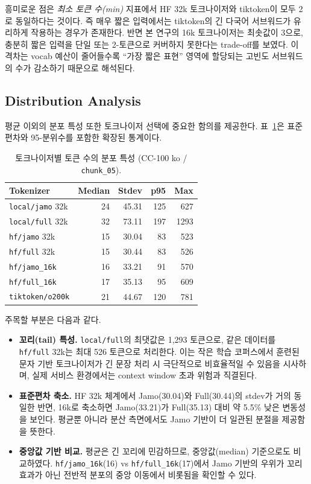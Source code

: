 \documentclass[sigconf,nonacm]{acmart}
\begin{document}
흥미로운 점은 \emph{최소 토큰 수(min)} 지표에서 HF 32k 토크나이저와 tiktoken이 모두 2로 동일하다는
것이다. 즉 매우 짧은 입력에서는 tiktoken의 긴 다국어 서브워드가 유리하게 작용하는 경우가
존재한다. 반면 본 연구의 16k 토크나이저는 최솟값이 3으로, 충분히 짧은 입력을 단일 또는 2-토큰으로
커버하지 못한다는 trade-off를 보였다. 이 격차는 vocab 예산이 줄어들수록 ``가장 짧은 표현'' 영역에
할당되는 고빈도 서브워드의 수가 감소하기 때문으로 해석된다.

\subsection{Distribution Analysis}

평균 이외의 분포 특성 또한 토크나이저 선택에 중요한 함의를 제공한다.
표~\ref{tab:stats_full}은 표준편차와 95-분위수를 포함한 확장된 통계이다.

\begin{table}[h]
\caption{토크나이저별 토큰 수의 분포 특성 (CC-100 ko / \texttt{chunk\_05}).}
\label{tab:stats_full}
\small
\begin{tabular}{lrrrr}
\toprule
Tokenizer & Median & Stdev & p95 & Max \\
\midrule
\texttt{local/jamo} 32k    & 24 & 45.31 & 125 & 627 \\
\texttt{local/full} 32k    & 32 & 73.11 & 197 & 1293 \\
\texttt{hf/jamo} 32k       & 15 & 30.04 & 83  & 523 \\
\texttt{hf/full} 32k       & 15 & 30.44 & 83  & 526 \\
\texttt{hf/jamo\_16k}      & 16 & 33.21 & 91  & 570 \\
\texttt{hf/full\_16k}      & 17 & 35.13 & 95  & 609 \\
\texttt{tiktoken/o200k}    & 21 & 44.67 & 120 & 781 \\
\bottomrule
\end{tabular}
\end{table}

주목할 부분은 다음과 같다.
\begin{itemize}
    \item \textbf{꼬리(tail) 특성.} \texttt{local/full}의 최댓값은 1,293 토큰으로, 같은 데이터를
    \texttt{hf/full} 32k는 최대 526 토큰으로 처리한다. 이는 작은 학습 코퍼스에서 훈련된 문자 기반
    토크나이저가 긴 문장 처리 시 극단적으로 비효율적일 수 있음을 시사하며, 실제 서비스 환경에서는
    context window 초과 위험과 직결된다.
    \item \textbf{표준편차 축소.} HF 32k 체계에서 Jamo(30.04)와 Full(30.44)의 stdev가 거의 동일한
    반면, 16k로 축소하면 Jamo(33.21)가 Full(35.13) 대비 약 5.5\% 낮은 변동성을 보인다. 평균뿐 아니라
    분산 측면에서도 Jamo 기반이 더 일관된 분절을 제공함을 뜻한다.
    \item \textbf{중앙값 기반 비교.} 평균은 긴 꼬리에 민감하므로, 중앙값(median) 기준으로도
    비교하였다. \texttt{hf/jamo\_16k}(16) vs \texttt{hf/full\_16k}(17)에서 Jamo 기반의 우위가
    꼬리 효과가 아닌 전반적 분포의 중앙 이동에서 비롯됨을 확인할 수 있다.
\end{itemize}
\end{document}
